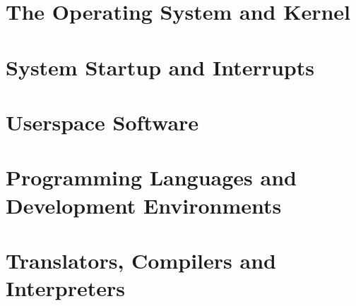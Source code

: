 \documentclass[../main.tex]{subfiles}
\begin{document}
\section{The Operating System and Kernel}
\label{4:sec:the_os_and_kernel}


\section{System Startup and Interrupts}
\label{4:sec:system_startup_and_interrupts}


\section{Userspace Software}
\label{4:sec:userspace_software}


\section{Programming Languages and Development Environments}
\label{4:sec:programming_languages_and_development_environments}


\section{Translators, Compilers and Interpreters}
\label{4:sec:translators_compilers_and_interpreters}

\end{document}
